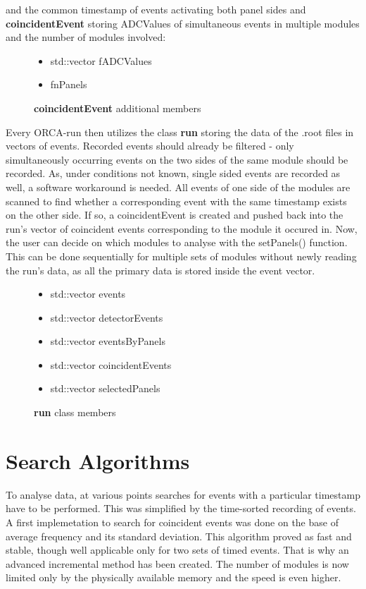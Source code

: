     and the common timestamp of events activating both panel sides and
    {\bf coincidentEvent} storing ADCValues of simultaneous events in multiple modules and the number of modules involved:
    \begin{figure}[H]
      \caption*{{\bf coincidentEvent} additional members}
	\begin{itemize}
	  \item std::vector fADCValues
	  \item fnPanels
      \end{itemize}
    \end{figure}
    Every ORCA-run then utilizes the class {\bf run} storing the data of the .root files in vectors of events.
    Recorded events should already be filtered - only simultaneously occurring events on the two sides of the same module should be recorded. As, under conditions not known, single sided events are recorded as well, a software workaround is needed. All events of one side of the modules are scanned to find whether a corresponding event with the same timestamp exists on the other side. If so, a coincidentEvent is created and pushed back into the run's vector of coincident events corresponding to the module it occured in.
    Now, the user can decide on which modules to analyse with the setPanels() function. This can be done sequentially for multiple sets of modules without newly reading the run's data, as all the primary data is stored inside the event vector.
    \begin{figure}[h]
      \caption*{{\bf run} class members}
	\begin{itemize}
	  \item std::vector events
	  \item std::vector detectorEvents
	  \item std::vector eventsByPanels
	  \item std::vector coincidentEvents
	  \item std::vector selectedPanels
      \end{itemize}
    \end{figure}
    
    
  
  \section{Search Algorithms}
  \label{ch:Analysis software:sec:Search algorithms}
    To analyse data, at various points searches for events with a particular timestamp have to be performed. This was simplified by the time-sorted recording of events. A first implemetation to search for coincident events was done on the base of average frequency and its standard deviation. This algorithm proved as fast and stable, though well applicable only for two sets of timed events. That is why an advanced incremental method has been created. The number of modules is now limited only by the physically available memory and the speed is even higher.
